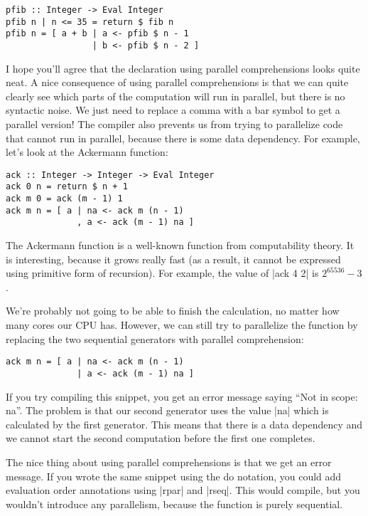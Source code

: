 \documentclass{tmr}
\begin{document}
\begin{verbatim}
pfib :: Integer -> Eval Integer
pfib n | n <= 35 = return $ fib n
pfib n = [ a + b | a <- pfib $ n - 1 
                 | b <- pfib $ n - 2 ]
\end{verbatim}
I hope you'll agree that the declaration using parallel comprehensions looks quite neat. A nice
consequence of using parallel comprehensions is that we can quite clearly see which parts of 
the computation will run in parallel, but there is no syntactic noise. We just need to replace 
a comma with a bar symbol to get a parallel version! The compiler also prevents us from trying to 
parallelize code that cannot run in parallel, because there is some data dependency. For example,
let's look at the Ackermann function: 

\begin{verbatim}
ack :: Integer -> Integer -> Eval Integer
ack 0 n = return $ n + 1
ack m 0 = ack (m - 1) 1
ack m n = [ a | na <- ack m (n - 1)
              , a <- ack (m - 1) na ]
\end{verbatim}
The Ackermann function is a well-known function from computability theory. It is interesting, 
because it grows really fast (as a result, it cannot be expressed using primitive form of 
recursion). For example, the value of |ack 4 2| is $2^{65536} - 3$. 

We're probably not going to be able to finish the calculation, no matter how many cores our CPU 
has. However, we can still try to parallelize the function by replacing the two sequential 
generators with parallel comprehension:

\begin{verbatim}
ack m n = [ a | na <- ack m (n - 1)
              | a <- ack (m - 1) na ]
\end{verbatim}
If you try compiling this snippet, you get an error message saying ``Not in scope: na''. The 
problem is that our second generator uses the value |na| which is calculated by the first generator.
This means that there is a data dependency and we cannot start the second computation before the
first one completes. 

The nice thing about using parallel comprehensions is that we get an error 
message. If you wrote the same snippet using the do notation, you could add evaluation order 
annotations using |rpar| and |rseq|. This would compile, but you wouldn't introduce any parallelism,
because the function is purely sequential.

\end{document}
